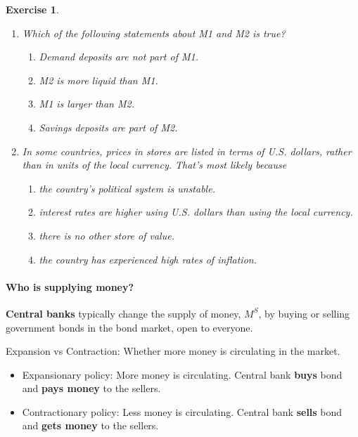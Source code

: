 \documentclass[12pt]{article}
\newtheorem{exercise}{Exercise}
\begin{document}
\begin{exercise}
    \begin{enumerate}[label=(\arabic*)]
		\item Which of the following statements about M1 and M2 is true?
		\begin{enumerate}[label=\Alph*]
			\item Demand deposits are not part of M1.
			\item M2 is more liquid than M1.
			\item M1 is larger than M2.
			\item Savings deposits are part of M2.
		\end{enumerate}
		\item In some countries, prices in stores are listed in terms of U.S. dollars, rather than in units of the local currency. That's most likely because
		\begin{enumerate}[label=\Alph*.]
			\item the country's political system is unstable.
			\item interest rates are higher using U.S. dollars than using the local currency.
			\item there is no other store of value. 
			\item the country has experienced high rates of inflation.
		\end{enumerate}
	\end{enumerate}
\end{exercise}

\paragraph{Who is supplying money?}
\textbf{Central banks} typically change the supply of money, $M^S$, by buying or selling government bonds in the bond market, open to everyone. 

Expansion vs Contraction: Whether more money is circulating in the market. 
\begin{itemize}
	\item Expansionary policy: More money is circulating. Central bank \textbf{buys} bond and \textbf{pays money} to the sellers.
	\item Contractionary policy: Less money is circulating. Central bank \textbf{sells} bond and \textbf{gets money} to the sellers. 
\end{itemize}
\end{document}
